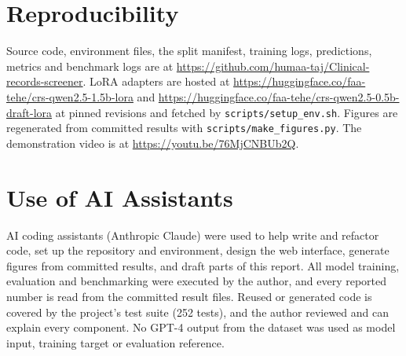 \documentclass[conference]{IEEEtran}
\newcommand{\code}[1]{\texttt{\small #1}}
\begin{document}
\section*{Reproducibility}
Source code, environment files, the split manifest, training logs, predictions, metrics and benchmark logs are at \url{https://github.com/humaa-taj/Clinical-records-screener}. LoRA adapters are hosted at \url{https://huggingface.co/faa-tehe/crs-qwen2.5-1.5b-lora} and \url{https://huggingface.co/faa-tehe/crs-qwen2.5-0.5b-draft-lora} at pinned revisions and fetched by \code{scripts/setup\_env.sh}. Figures are regenerated from committed results with \code{scripts/make\_figures.py}. The demonstration video is at \url{https://youtu.be/76MjCNBUb2Q}.

\appendices
\section{Use of AI Assistants}
AI coding assistants (Anthropic Claude) were used to help write and refactor code, set up the repository and environment, design the web interface, generate figures from committed results, and draft parts of this report. All model training, evaluation and benchmarking were executed by the author, and every reported number is read from the committed result files. Reused or generated code is covered by the project's test suite (252 tests), and the author reviewed and can explain every component. No GPT-4 output from the dataset was used as model input, training target or evaluation reference.



\end{document}
